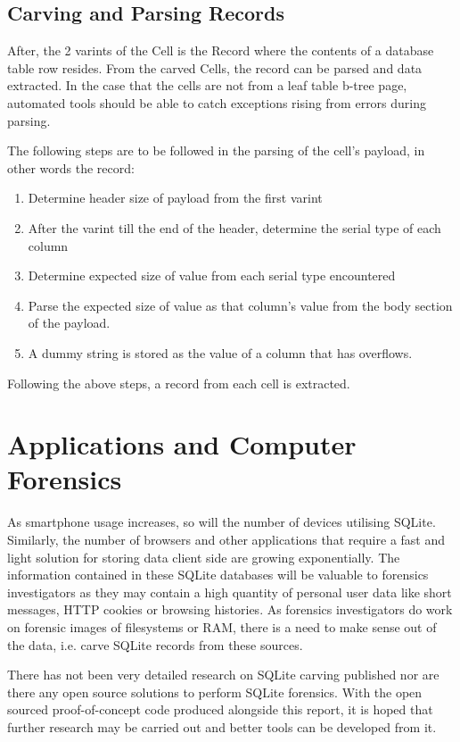 \documentclass{article}
\begin{document}
\subsection{Carving and Parsing Records}

After, the 2 varints of the Cell is the Record where the contents of a database table row resides. From the carved Cells, the record can be parsed and data extracted. In the case that the cells are not from a leaf table b-tree page, automated tools should be able to catch exceptions rising from errors during parsing.

\noindent The following steps are to be followed in the parsing of the cell’s payload, in other words the record:

\begin{enumerate}
\item Determine header size of payload from the first varint
\item After the varint till the end of the header, determine the serial type of each column
\item Determine expected size of value from each serial type encountered
\item Parse the expected size of value as that column’s value from the body section of the payload.
\item A dummy string is stored as the value of a column that has overflows.
\end{enumerate}

Following the above steps, a record from each cell is extracted.

\section{Applications and Computer Forensics}

As smartphone usage increases, so will the number of devices utilising SQLite. Similarly, the number of browsers and other applications that require a fast and light solution for storing data client side are growing exponentially. The information contained in these SQLite databases will be valuable to forensics investigators as they may contain a high quantity of personal user data like short messages, HTTP cookies or browsing histories. As forensics investigators do work on forensic images of filesystems or RAM, there is a need to make sense out of the data, i.e. carve SQLite records from these sources. 

There has not been very detailed research on SQLite carving published nor are there any open source solutions to perform SQLite forensics. With the open sourced proof-of-concept code produced alongside this report, it is hoped that further research may be carried out and better tools can be developed from it.
\end{document}
